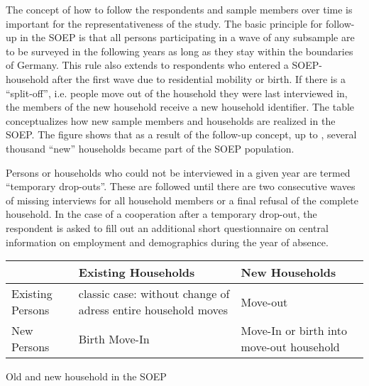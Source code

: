 \documentclass[letterpaper,10pt,openany,onesideH,english]{sphinxmanual}
\begin{document}
The concept of how to follow the respondents and sample members over time is important for the representativeness of the study. The basic principle for follow-up in the SOEP is that all persons participating in a wave of any subsample are to be surveyed in the following years as long as they stay within the boundaries of Germany. This rule also extends to respondents who entered a SOEP-household after the first wave due to residential mobility or birth. If there is a “split-off”, i.e. people move out of the household they were last interviewed in, the members of the new household receive a new household identifier. The table conceptualizes how new sample members and households are realized in the SOEP. The figure shows that as a result of the follow-up concept, up to , several thousand “new” households became part of the SOEP population.

Persons or households who could not be interviewed in a given year are termed “temporary drop-outs”. These are followed until there are two consecutive waves of missing interviews for all household members or a final refusal of the complete household. In the case of a cooperation after a temporary drop-out, the respondent is asked to fill out an additional short questionnaire on central information on employment and demographics during the year of absence.


\begin{savenotes}\sphinxattablestart
\centering
\begin{tabulary}{\linewidth}[t]{|T|T|T|}
\hline
\sphinxstyletheadfamily &\sphinxstyletheadfamily 
Existing Households
&\sphinxstyletheadfamily 
New Households
\\
\hline
Existing Persons
&
classic case: without change of adress entire household moves
&
Move-out
\\
\hline
New Persons
&
Birth Move-In
&
Move-In or birth into move-out household
\\
\hline
\end{tabulary}
\par
\sphinxattableend\end{savenotes}

 Old and new household in the SOEP

\begin{figure}[H]
\centering

\noindent{}
\end{figure}

\end{document}
